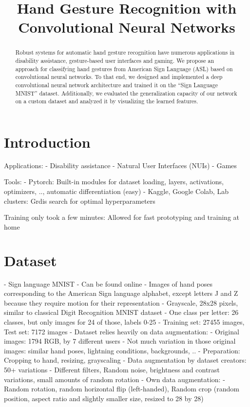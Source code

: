 \documentclass[a4paper]{article}
\title{Hand Gesture Recognition with Convolutional Neural Networks}
\begin{document}
\maketitle
%
\begin{abstract}
Robust systems for automatic hand gesture recognition have numerous applications in disability assistance, gesture-based user interfaces and gaming. We propose an approach for classifying hand gestures from American Sign Language (ASL) based on convolutional neural networks. To that end, we designed and implemented a deep convolutional neural network architecture and trained it on the \enquote{Sign Language MNIST} dataset. Additionally, we evaluated the generalization capacity of our network on a custom dataset and analyzed it by visualizing the learned features.
\end{abstract}

\section{Introduction}

Applications:
- Disability assistance
- Natural User Interfaces (NUIs)
- Games

Tools:
- Pytorch: Built-in modules for dataset loading, layers, activations, optimizers, .., automatic differentiation (easy)
- Kaggle, Google Colab, Lab clusters: Grdis search for optimal hyperparameters

Training only took a few minutes: Allowed for fast prototyping and training at home

\section{Dataset}

- Sign language MNIST
- Can be found online
- Images of hand poses corresponding to the American Sign language alphabet, except letters J and Z because they require motion for their representation
- Grayscale, 28x28 pixels, similar to classical Digit Recognition MNIST dataset
- One class per letter: 26 classes, but only images for 24 of those, labels 0-25
- Training set: 27455 images, Test set: 7172 images
- Dataset relies heavily on data augmentation:
  - Original images: 1794 RGB, by 7 different users
  - Not much variation in those original images: similar hand poses, lightning conditions, backgrounds, ..
  - Preparation: Cropping to hand, resizing, grayscaling
  - Data augmentation by dataset creators: 50+ variations
    - Different filters, Random noise, brightness and contrast variations, small amounts of random rotation
  - Own data augmentation:
    - Random rotation, random horizontal flip (left-handed), Random crop (random position, aspect ratio and slightly smaller size, resized to 28 by 28)
\end{document}

